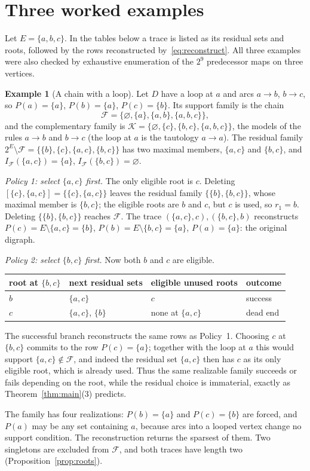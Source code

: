 \documentclass[11pt,a4paper]{article}
\theoremstyle{plain}
\theoremstyle{definition}
\newtheorem{example}[theorem]{Example}
\theoremstyle{remark}
\newcommand{\cF}{\mathcal F}
\newcommand{\cK}{\mathcal K}
\newcommand{\Int}{I_{\cF}}
\newcommand{\ivl}[2]{[\{#1\},#2]}
\newcommand{\pw}[1]{2^{#1}}
\begin{document}
\section{Three worked examples}\label{sec:examples}

Let $E=\{a,b,c\}$. In the tables below a trace is listed as its residual sets and roots, followed by the rows reconstructed by~\eqref{eq:reconstruct}. All three examples were also checked by exhaustive enumeration of the $2^{9}$ predecessor maps on three vertices.

\begin{example}[A chain with a loop]\label{ex:chain}
Let $D$ have a loop at $a$ and arcs $a\to b$, $b\to c$, so $P(a)=\{a\}$, $P(b)=\{a\}$, $P(c)=\{b\}$. Its support family is the chain
\[
 \cF=\{\varnothing,\{a\},\{a,b\},\{a,b,c\}\},
\]
and the complementary family is $\cK=\{\varnothing,\{c\},\{b,c\},\{a,b,c\}\}$, the models of the rules $a\to b$ and $b\to c$ (the loop at $a$ is the tautology $a\to a$). The residual family $\pw{E}\setminus\cF=\{\{b\},\{c\},\{a,c\},\{b,c\}\}$ has two maximal members, $\{a,c\}$ and $\{b,c\}$, and $\Int(\{a,c\})=\{a\}$, $\Int(\{b,c\})=\varnothing$.

\emph{Policy 1: select $\{a,c\}$ first.} The only eligible root is $c$. Deleting $\ivl{c}{\{a,c\}}=\{\{c\},\{a,c\}\}$ leaves the residual family $\{\{b\},\{b,c\}\}$, whose maximal member is $\{b,c\}$; the eligible roots are $b$ and $c$, but $c$ is used, so $r_1=b$. Deleting $\{\{b\},\{b,c\}\}$ reaches $\cF$. The trace $(\{a,c\},c),(\{b,c\},b)$ reconstructs $P(c)=E\setminus\{a,c\}=\{b\}$, $P(b)=E\setminus\{b,c\}=\{a\}$, $P(a)=\{a\}$: the original digraph.

\emph{Policy 2: select $\{b,c\}$ first.} Now both $b$ and $c$ are eligible.
\begin{center}
\begin{tabular}{@{}llll@{}}
\toprule
root at $\{b,c\}$ & next residual sets & eligible unused roots & outcome\\
\midrule
$b$ & $\{a,c\}$ & $c$ & success\\
$c$ & $\{a,c\}$, $\{b\}$ & none at $\{a,c\}$ & dead end\\
\bottomrule
\end{tabular}
\end{center}
The successful branch reconstructs the same rows as Policy~1. Choosing $c$ at $\{b,c\}$ commits to the row $P(c)=\{a\}$; together with the loop at $a$ this would support $\{a,c\}\notin\cF$, and indeed the residual set $\{a,c\}$ then has $c$ as its only eligible root, which is already used. Thus the same realizable family succeeds or fails depending on the root, while the residual choice is immaterial, exactly as Theorem~\ref{thm:main}(3) predicts.

The family has four realizations: $P(b)=\{a\}$ and $P(c)=\{b\}$ are forced, and $P(a)$ may be any set containing $a$, because arcs into a looped vertex change no support condition. The reconstruction returns the sparsest of them. Two singletons are excluded from $\cF$, and both traces have length two (Proposition~\ref{prop:roots}).
\end{example}
\end{document}
